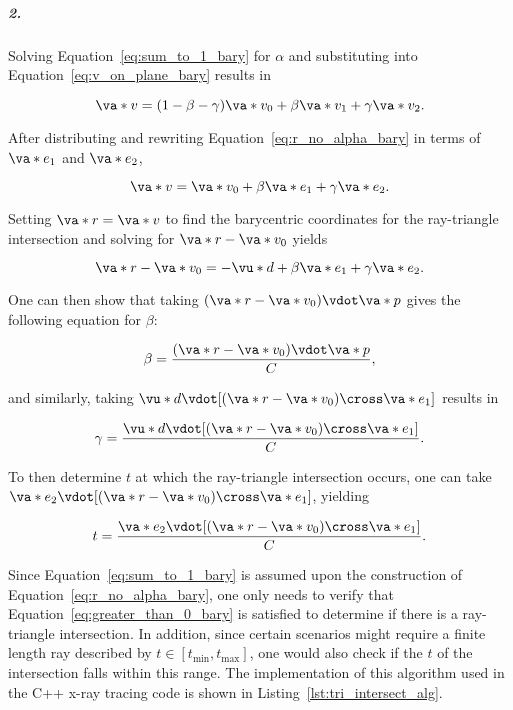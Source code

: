 \subparagraph{2.}
Solving Equation~\ref{eq:sum_to_1_bary} for $\alpha$ and substituting into Equation~\ref{eq:v_on_plane_bary} results in

\begin{equation}
 \va*{v} = (1 - \beta - \gamma)\va*{v_0} + \beta\va*{v_1} + \gamma\va*{v_2}.
 \label{eq:r_no_alpha_bary}
\end{equation}

\noindent After distributing and rewriting Equation~\ref{eq:r_no_alpha_bary} in terms of $\va*{e_1}$ and $\va*{e_2}$, 

\begin{equation}
  \va*{v} = \va*{v_0} + \beta \va*{e_1} + \gamma \va*{e_2}.
  \label{eq:r_no_alpha_bary_simp}
\end{equation}

\noindent Setting $\va*{r} = \va*{v}$ to find the barycentric coordinates for the ray-triangle intersection and solving for $\va*{r} - \va*{v_0}$ yields

\begin{equation}
  \va*{r} - \va*{v_0} = -\vu*{d} + \beta \va*{e_1} + \gamma \va*{e_2}.
\end{equation}

\noindent One can then show that taking $(\va*{r} - \va*{v_0}) \vdot \va*{p}$ gives the following equation for $\beta$:

\begin{equation}
  \beta = \frac{(\va*{r} - \va*{v_0}) \vdot \va*{p}}{C},
  \label{eq:beta_bary}
\end{equation}

\noindent and similarly, taking $\vu*{d} \vdot [(\va*{r} - \va*{v_0}) \cross \va*{e_1}]$ results in

\begin{equation}
  \gamma = \frac{\vu*{d} \vdot [(\va*{r} - \va*{v_0}) \cross \va*{e_1}]}{C}.
  \label{eq:gamma_bary}
\end{equation}

\noindent To then determine $t$ at which the ray-triangle intersection occurs, one can take $\va*{e_2} \vdot [(\va*{r} - \va*{v_0}) \cross \va*{e_1}]$, yielding

\begin{equation}
  t = \frac{\va*{e_2} \vdot [(\va*{r} - \va*{v_0}) \cross \va*{e_1}]}{C}.
  \label{eq:t_bary}
\end{equation}

\noindent Since Equation~\ref{eq:sum_to_1_bary} is assumed upon the construction of Equation~\ref{eq:r_no_alpha_bary}, one only needs to verify that Equation~\ref{eq:greater_than_0_bary} is satisfied to determine if there is a ray-triangle intersection. In addition, since certain scenarios might require a finite length ray described by $t\in[t_{\textrm{min}}, t_{\textrm{max}}]$, one would also check if the $t$ of the intersection falls within this range. The implementation of this algorithm used in the C++ x-ray tracing code is shown in Listing~\ref{lst:tri_intersect_alg}.


